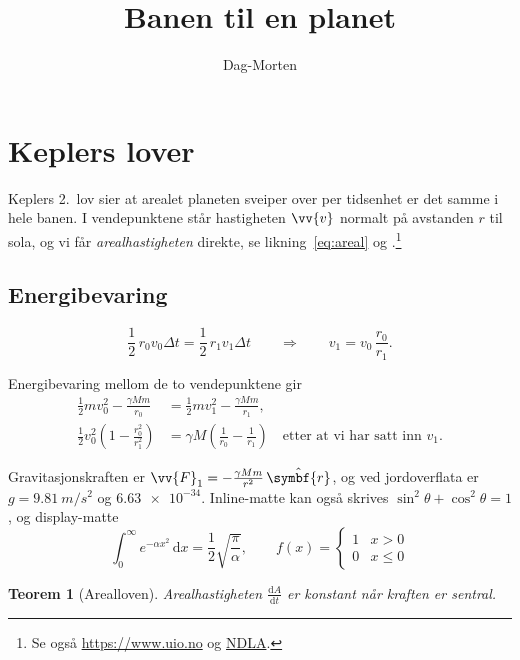 \documentclass[a4paper,11pt]{article}
\title{Banen til en planet}
\author{Dag-Morten}
\newcommand{\dd}{\mathrm{d}}
\newtheorem{teorem}{Teorem}[section]
\begin{document}
\maketitle
\tableofcontents

\section{Keplers lover}\label{sec:kepler}

Keplers 2.\ lov sier at arealet planeten sveiper over per tidsenhet er det samme i hele banen. I vendepunktene står hastigheten $\vv{v}$ normalt på avstanden $r$ til sola, og vi får \emph{arealhastigheten} direkte, se likning~\eqref{eq:areal} og \cite[s.~12]{griffiths2017}.\footnote{Se også \url{https://www.uio.no} og \href{https://ndla.no}{NDLA}.}

\subsection*{Energibevaring}

\begin{equation}
    \frac{1}{2}\, r_0 v_0 \Delta t = \frac{1}{2}\, r_1 v_1 \Delta t
    \qquad\Longrightarrow\qquad
    v_1 = v_0\,\frac{r_0}{r_1} .
    \label{eq:areal}
\end{equation}

Energibevaring mellom de to vendepunktene gir
\begin{align*}
    \frac{1}{2} m v_0^2 - \frac{\gamma M m}{r_0} &= \frac{1}{2} m v_1^2 - \frac{\gamma M m}{r_1} , \\
    \frac{1}{2} v_0^2 \left(1 - \frac{r_0^2}{r_1^2}\right) &= \gamma M \left(\frac{1}{r_0} - \frac{1}{r_1}\right) \quad \text{etter at vi har satt inn $v_1$.}
\end{align*}

Gravitasjonskraften er $\vv{F}_1 = -\frac{\gamma M m}{r^2}\,\hat{\symbf{r}}$, og ved jordoverflata er $g = \qty{9,81}{m/s^2}$ og $\num{6,63e-34}$. Inline-matte kan også skrives \( \sin^2\theta + \cos^2\theta = 1 \), og display-matte
\[
    \int_0^\infty e^{-\alpha x^2} \,\dd x = \frac{1}{2}\sqrt{\frac{\pi}{\alpha}} , \qquad
    f(x) = \begin{cases} 1 & x > 0 \\ 0 & x \le 0 \end{cases}
\]

\begin{teorem}[Arealloven]\label{thm:areal}
Arealhastigheten $\frac{\dd A}{\dd t}$ er konstant når kraften er sentral.
\end{teorem}
\end{document}
